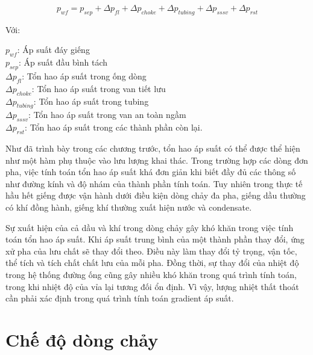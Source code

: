 \documentclass[12pt,a4paper]{report}
\begin{document}
	\begin{equation}
		p_{wf}=p_{sep}+\Delta p_{fl} +\Delta p_{choke} + \Delta p_{tubing} + \Delta p_{sssv} + \Delta p_{rst}
	\end{equation}

Với:

\hspace*{1cm}$p_{wf}$: Áp suất đáy giếng\\
\hspace*{1cm}$p_{sep}$: Áp suất đầu bình tách\\
\hspace*{1cm}$\Delta p_{fl}$: Tổn hao áp suất trong ống dòng\\
\hspace*{1cm}$\Delta p_{choke}$: Tổn hao áp suất trong van tiết lưu\\
\hspace*{1cm}$\Delta p_{tubing}$: Tổn hao áp suất trong tubing\\
\hspace*{1cm}$\Delta p_{sssv}$: Tổn hao áp suất trong van an toàn ngầm\\
\hspace*{1cm}$\Delta p_{rst}$: Tổn hao áp suất trong các thành phần còn lại.

Như đã trình bày trong các chương trước, tổn hao áp suất có thể được thể hiện như một hàm phụ thuộc vào lưu lượng khai thác. Trong trường hợp các dòng đơn pha, việc tính toán tổn hao áp suất khá đơn giản khi biết đầy đủ các thông số như đường kính và độ nhám của thành phần tính toán. Tuy nhiên trong thực tế hầu hết giếng được vận hành dưới điều kiện dòng chảy đa pha, giếng dầu thường có khí đồng hành, giếng khí thường xuất hiện nước và condensate.

Sự xuất hiện của cả dầu và khí trong dòng chảy gây khó khăn trong việc tính toán tổn hao áp suất. Khi áp suất trung bình của một thành phần thay đổi, ứng xử pha của lưu chất sẽ thay đổi theo. Điều này làm thay đổi tỷ trọng, vận tốc, thể tích và tích chất chất lưu của mỗi pha. Đồng thời, sự thay đổi của nhiệt độ trong hệ thống đường ống cũng gây nhiều khó khăn trong quá trình tính toán, trong khi nhiệt độ của vỉa lại tương đối ổn định. Vì vậy, lượng nhiệt thất thoát cần phải xác định trong quá trình tính toán gradient áp suất.

\section{Chế độ dòng chảy}
\end{document}

